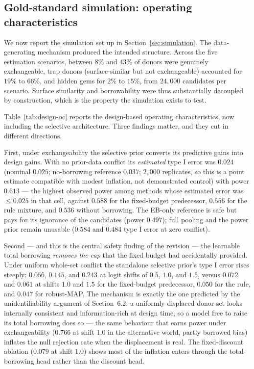 \documentclass[11pt]{article}
\begin{document}
\subsection{Gold-standard simulation: operating characteristics}
\label{sec:goldsim-results}

We now report the simulation set up in Section~\ref{sec:simulation}. The
data-generating mechanism produced the intended structure. Across the five
estimation scenarios, between $8\%$ and $43\%$ of donors were genuinely
exchangeable, trap donors (surface-similar but not exchangeable) accounted for
$19\%$ to $66\%$, and hidden gems for $2\%$ to $15\%$, from $24{,}000$ candidates
per scenario. Surface similarity and borrowability were thus substantially
decoupled by construction, which is the property the simulation exists to test.

Table~\ref{tab:design-oc} reports the design-based operating characteristics,
now including the selective architecture. Three findings matter, and they cut
in different directions.

First, under exchangeability the selective prior converts its predictive
gains into design gains. With no prior-data conflict its \emph{estimated}
type I error was
$0.024$ (nominal $0.025$; no-borrowing reference $0.037$; $2{,}000$
replicates, so this is a point estimate compatible with modest inflation,
not demonstrated control) with power $0.613$
--- the highest observed power among methods whose estimated error was
$\le 0.025$ in that cell, against $0.588$
for the fixed-budget predecessor, $0.556$ for the rule mixture, and $0.536$
without borrowing. The EB-only reference is safe but pays for its ignorance of
the candidates (power $0.497$); full pooling and the power prior remain
unusable ($0.584$ and $0.484$ type I error at zero conflict).

Second --- and this is the central safety finding of the revision --- the
learnable total borrowing \emph{removes the cap} that the fixed budget had
accidentally provided. Under uniform whole-set conflict the standalone
selective prior's type I error rises steeply: $0.056$, $0.145$, and $0.243$ at
logit shifts of $0.5$, $1.0$, and $1.5$, versus $0.072$ and $0.061$ at shifts
$1.0$ and $1.5$ for the fixed-budget predecessor, $0.050$ for the rule, and
$0.047$ for robust-MAP. The mechanism is exactly the one predicted by the
unidentifiability argument of Section~6.2: a uniformly displaced donor set
looks internally consistent and information-rich at design time, so a model
free to raise its total borrowing does so --- the same behaviour that earns
power under exchangeability ($0.766$ at shift $1.0$ in the alternative world,
partly borrowed bias) inflates the null rejection rate when the displacement
is real. The fixed-discount ablation ($0.079$ at shift $1.0$) shows most of
the inflation enters through the total-borrowing head rather than the
discount head.
\end{document}
